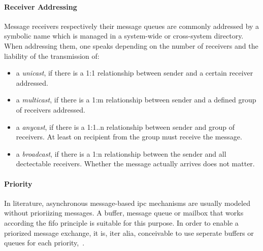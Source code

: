 \paragraph{Receiver Addressing}
Message receivers respectively their message queues are commonly addressed by a symbolic name which is managed in a system-wide or cross-system directory.
When addressing them, one speaks depending on the number of receivers and the liability of the transmission of:
\begin{itemize}
    \item a \textit{unicast}, if there is a 1:1 relationship between sender and a certain receiver addressed.
    \item a \textit{multicast}, if there is a 1:m relationship between sender and a defined group of receivers addressed.
    \item a \textit{anycast}, if there is a 1:1..n relationship between sender and group of receivers. At least on recipient from the group must receive the message.
    \item a \textit{broadcast}, if there is a 1:n relationship between the sender and all dectectable receivers. Whether the message actually arrives does not matter\cite{glatz2015betriebssysteme}.
\end{itemize}

\paragraph{Priority}
In literature, asynchronous message-based \ac{ipc} mechanisms are usually modeled without prioriizing messages.
A buffer, message queue or mailbox that works according the \ac{fifo} principle is suitable for this purpose.
In order to enable a priorized message exchange, it is, iter alia, conceivable to use seperate buffers or queues for each priority\cite{glatz2015betriebssysteme},~\cite{tanenbaum-modern-operating-systems}.


